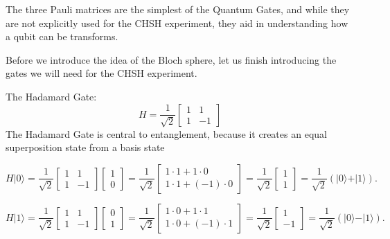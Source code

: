 \documentclass[12pt]{article}
\begin{document}
The three Pauli matrices are the simplest of the Quantum Gates, and while they are not explicitly used for the CHSH experiment, they aid in understanding how a qubit can be transforms. 

\vspace{0.5cm}

Before we introduce the idea of the Bloch sphere, let us finish introducing the gates we will need for the CHSH experiment.

\vspace{1cm}

The Hadamard Gate:
$$
H = \frac{1}{\sqrt{2}}
\begin{bmatrix}
1 &  1 \\
1 & -1 
\end{bmatrix}
$$
The Hadamard Gate is central to entanglement, because it creates an equal superposition state from a basis state

$$
H \vert 0 \rangle = 
\frac{1}{\sqrt{2}} \begin{bmatrix} 1 & 1 \\ 1 & -1 \end{bmatrix}
\begin{bmatrix} 1 \\ 0 \end{bmatrix}
=
\frac{1}{\sqrt{2}} \begin{bmatrix} 1\cdot1 + 1\cdot0 \\ 1\cdot1 + (-1)\cdot0 \end{bmatrix}
=
\frac{1}{\sqrt{2}} \begin{bmatrix} 1 \\ 1 \end{bmatrix}
=
\frac{1}{\sqrt{2}} \left( \vert 0 \rangle + \vert 1 \rangle \right).
$$

$$
H \vert 1 \rangle = 
\frac{1}{\sqrt{2}} \begin{bmatrix} 1 & 1 \\ 1 & -1 \end{bmatrix}
\begin{bmatrix} 0 \\ 1 \end{bmatrix}
=
\frac{1}{\sqrt{2}} \begin{bmatrix} 1\cdot0 + 1\cdot1 \\ 1\cdot0 + (-1)\cdot1 \end{bmatrix}
=
\frac{1}{\sqrt{2}} \begin{bmatrix} 1 \\ -1 \end{bmatrix}
=
\frac{1}{\sqrt{2}} \left( \vert 0 \rangle - \vert 1 \rangle \right).
$$
\end{document}
